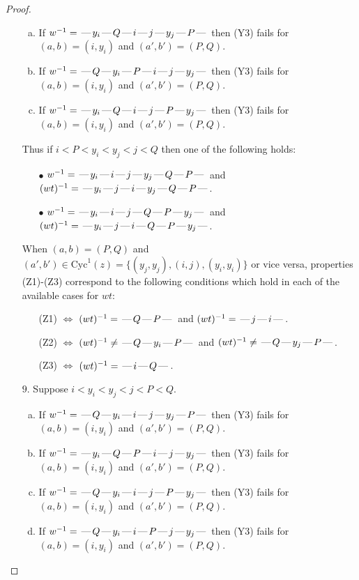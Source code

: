 \documentclass[10pt]{article}
\theoremstyle{definition}
\theoremstyle{definition}
\def\dash{\text{\hspace{0.5mm}---\hspace{0.5mm}}}
\def\Cyc{\mathrm{Cyc}}
\begin{document}
\begin{proof}
\begin{enumerate}
\begin{enumerate}[(a)]
\item If $w^{-1} = \dash y_i\dash Q\dash i\dash j\dash y_j\dash P\dash $ then (Y3) fails for $(a,b)=(i,y_i)$ and $(a',b')=(P,Q)$.
\item If $w^{-1} = \dash Q\dash y_i\dash P\dash i\dash j\dash y_j\dash $ then (Y3) fails for $(a,b)=(i,y_i)$ and $(a',b')=(P,Q)$.
\item If $w^{-1} = \dash y_i\dash Q\dash i\dash j\dash P\dash y_j\dash $ then (Y3) fails for $(a,b)=(i,y_i)$ and $(a',b')=(P,Q)$.
\end{enumerate}
Thus if $i < P < y_i < y_j < j < Q$ then one of the following holds:
\begin{enumerate}
\item[$\bullet$] $w^{-1} = \dash y_i\dash i\dash j\dash y_j\dash Q\dash P\dash $ and $(wt)^{-1} = \dash y_i\dash j\dash i\dash y_j\dash Q\dash P\dash $.
\item[$\bullet$] $w^{-1} = \dash y_i\dash i\dash j\dash Q\dash P\dash y_j\dash $ and $(wt)^{-1} = \dash y_i\dash j\dash i\dash Q\dash P\dash y_j\dash $.
\end{enumerate}
When $(a,b)= (P,Q)$ and $(a',b')\in \Cyc^1(z)=\{(y_j,y_j),(i,j),(y_i,y_i)\}$ or vice versa,
properties (Z1)-(Z3) correspond to the following conditions which
hold in each of the available cases for $wt$:
\begin{enumerate}
\item[](Z1) $\Leftrightarrow$ $(wt)^{-1} = \dash Q \dash P \dash$  and $(wt)^{-1} = \dash j \dash i \dash$.
\item[](Z2) $\Leftrightarrow$ $(wt)^{-1} \neq \dash Q \dash y_i \dash P \dash$  and $(wt)^{-1} \neq \dash Q \dash y_j \dash P \dash$.
\item[](Z3) $\Leftrightarrow$ $(wt)^{-1} = \dash i \dash Q \dash$.
\end{enumerate}
\item[$9$.] Suppose $i < y_i < y_j < j < P < Q$.
\begin{enumerate}[(a)]
\item If $w^{-1} = \dash Q\dash y_i\dash i\dash j\dash y_j\dash P\dash $ then (Y3) fails for $(a,b)=(i,y_i)$ and $(a',b')=(P,Q)$.
\item If $w^{-1} = \dash y_i\dash Q\dash P\dash i\dash j\dash y_j\dash $ then (Y3) fails for $(a,b)=(i,y_i)$ and $(a',b')=(P,Q)$.
\item If $w^{-1} = \dash Q\dash y_i\dash i\dash j\dash P\dash y_j\dash $ then (Y3) fails for $(a,b)=(i,y_i)$ and $(a',b')=(P,Q)$.
\item If $w^{-1} = \dash Q\dash y_i\dash i\dash P\dash j\dash y_j\dash $ then (Y3) fails for $(a,b)=(i,y_i)$ and $(a',b')=(P,Q)$.

\end{enumerate}
\end{enumerate}
\end{proof}
\end{document}
